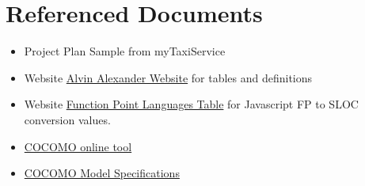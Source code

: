 \section{Referenced Documents}
\begin{itemize}
\item Project Plan Sample from myTaxiService
\item Website \href{http://alvinalexander.com/FunctionPoints/FunctionPoints.shtml}{Alvin Alexander Website} for tables and definitions
\item Website \href{http://www.qsm.com/resources/function-point-languages-table}{Function Point Languages Table} for Javascript FP to SLOC conversion values.
\item \href{http://csse.usc.edu/tools/COCOMOII.php}{COCOMO online tool}
\item \href{http://csse.usc.edu/csse/research/COCOMOII/cocomo2000.0/CII_modelman2000.0.pdf}{COCOMO Model Specifications}
\end{itemize}